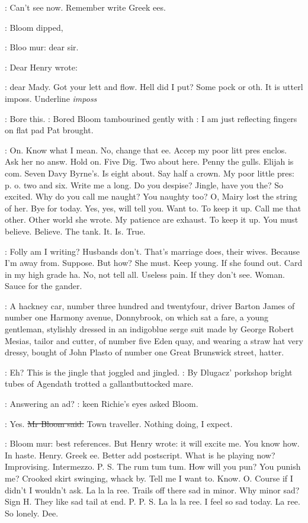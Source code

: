 \BloomInt:
Can't see now.
Remember write Greek ees.

:
Bloom dipped,

\BloomInt:
Bloo mur:
dear sir.

:
Dear Henry wrote:

\BloomInt:
dear Mady.
Got your lett and flow.
Hell did I put?
Some pock or oth.
It is utterl imposs.
Underline \emph{imposs}

\BloomInt:
Bore this.
:
Bored Bloom tambourined gently with
\BloomInt:
I am just reflecting
fingers on flat pad Pat brought.

\BloomInt:
On.
Know what I mean.
No,
change that ee.
Accep my poor litt pres
enclos.
Ask her no answ.
Hold on.
Five Dig.
Two about here.
Penny the
gulls.
Elijah is com.
Seven Davy Byrne's.
Is eight about.
Say half a
crown.
My poor little pres:
p.
o.
two and six.
Write me a long.
Do you
despise?
Jingle,
have you the?
So excited.
Why do you call me naught?
You naughty too?
O,
Mairy lost the string of her.
Bye for today.
Yes,
yes,
will tell you.
Want to.
To keep it up.
Call me that other.
Other world she
wrote.
My patience are exhaust.
To keep it up.
You must believe.
Believe.
The tank.
It.
Is.
True.

\BloomInt:
Folly am I writing?
Husbands don't.
That's marriage does,
their
wives.
Because I'm away from.
Suppose.
But how?
She must.
Keep young.
If she found out.
Card in my high grade ha.
No,
not tell all.
Useless
pain.
If they don't see.
Woman.
Sauce for the gander.

:
A hackney car,
number three hundred and twentyfour,
driver Barton James of
number one Harmony avenue,
Donnybrook,
on which sat a fare,
a young gentleman,
stylishly dressed in an indigoblue serge suit made by
George Robert Mesias,
tailor and cutter,
of number five Eden quay,
and
wearing a straw hat very dressy,
bought of John Plasto of number one
Great Brunswick street,
hatter.

\BloomInt:
Eh?
This is the jingle that joggled and jingled.
:
By Dlugacz' porkshop bright tubes of Agendath trotted a
gallantbuttocked mare.

\goulding:
Answering an ad?
:
keen Richie's eyes asked Bloom.

\Bloom:
Yes.
\sout{Mr Bloom said.}
Town traveller.
Nothing doing,
I expect.

\BloomInt:
Bloom mur:
best references.
But Henry wrote:
it will excite me.
You
know how.
In haste.
Henry.
Greek ee.
Better add postscript.
What is he
playing now?
Improvising.
Intermezzo.
P.
S.
The rum tum tum.
How will
you pun?
You punish me?
Crooked skirt swinging,
whack by.
Tell me I want
to.
Know.
O.
Course if I didn't I wouldn't ask.
La la la ree.
Trails off
there sad in minor.
Why minor sad?
Sign H.
They like sad tail at end.
P.
P.
S.
La la la ree.
I feel so sad today.
La ree.
So lonely.
Dee.

